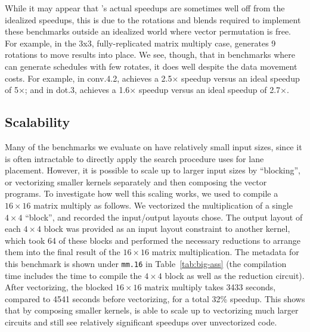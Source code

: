 While it may appear that \system's actual speedups are sometimes well off from the idealized speedups, this is due to the rotations and blends required to implement these benchmarks outside an idealized world where vector permutation is free. For example, in the \textsf{3x3}, fully-replicated matrix multiply case, \system generates 9 rotations to move results into place. We see, though, that in benchmarks where \system can generate schedules with few rotates, it does well despite the data movement costs. For example, in \textsf{conv.4.2}, \system achieves a 2.5$\times$ speedup versus an ideal speedup of 5$\times$; and in \textsf{dot.3}, \system achieves a 1.6$\times$ speedup versus an ideal speedup of 2.7$\times$.

\subsection{Scalability}\label{sec:scalability}
Many of the benchmarks we evaluate on have relatively small input sizes, since it is often intractable to directly apply the search procedure \system uses for lane placement.
However, it is possible to scale \system up to larger input sizes by ``blocking'', or vectorizing smaller kernels separately and then composing the vector programs.
To investigate how well this scaling works, we used \system to compile a $16\times 16$ matrix multiply as follows.
We vectorized the multiplication of a single $4\times 4$ ``block'', and recorded the input/output layouts \system chose.
The output layout of each $4\times 4$ block was provided as an input layout constraint  to another kernel, which took 64 of these blocks and performed the necessary reductions to arrange them into the final result of the $16\times 16$ matrix multiplication.
The metadata for this benchmark is shown under {\tt mm.16} in Table~\ref{tab:big-ass} (the compilation time includes the time to compile the $4\times 4$ block as well as the reduction circuit).
After vectorizing, the blocked $16\times 16$ matrix multiply takes 3433 seconds, compared to 4541 seconds before vectorizing, for a total 32\% speedup.
This shows that by composing smaller kernels, \system is able to scale up to vectorizing much larger circuits and still see relatively significant speedups over unvectorized code. 

